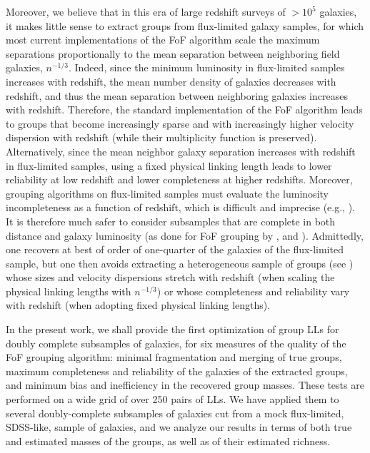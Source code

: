 Moreover, we believe that in this era of large  redshift surveys of $>10^5$
galaxies, it makes little sense to extract groups from flux-limited galaxy
samples, for which most current implementations of the FoF algorithm scale the
maximum separations proportionally to the mean  separation between neighboring
field galaxies, $n^{-1/3}$. Indeed, since the minimum luminosity in
flux-limited samples increases with redshift,  the mean number density of
galaxies decreases with redshift, and thus the mean separation between
neighboring galaxies increases with redshift. Therefore, the standard
implementation of the FoF algorithm leads to groups that become increasingly
sparse and with increasingly higher velocity dispersion with redshift (while
their multiplicity function is preserved). Alternatively, since the mean
neighbor galaxy separation increases with redshift in flux-limited samples,
using a fixed physical linking length leads to lower reliability at low
redshift and lower completeness at higher redshifts. Moreover, grouping
algorithms on flux-limited samples must evaluate the luminosity incompleteness
as a function of redshift, which is difficult and imprecise (e.g.,
\citealp{MDNC02,Yang+07}). It is therefore much safer to consider subsamples
that are complete in both distance and galaxy luminosity (as done for FoF
grouping by \citealp{Berlind+06}, \citealp{Tago+10} and \citealp{Tempel+14}).
Admittedly, one recovers at best of order of one-quarter of the galaxies of the
flux-limited sample, but one then avoids extracting a heterogeneous sample of
groups (see \citealp{Tempel+14}) whose sizes and velocity dispersions stretch
with redshift (when scaling the physical linking lengths with $n^{-1/3}$) or
whose completeness and reliability vary with redshift (when adopting fixed
physical linking lengths).

In the present work, we shall provide the first optimization of group LLs for
doubly complete subsamples of galaxies, for six measures of the quality of the
FoF grouping algorithm: minimal fragmentation and merging of true groups,
maximum completeness and reliability of the galaxies of the extracted groups,
and minimum bias and inefficiency in the recovered group masses. These tests
are performed on a wide grid of over 250 pairs of LLs. We have applied them to
several doubly-complete subsamples of galaxies cut from a mock flux-limited,
SDSS-like,  sample of galaxies, and we analyze our results in terms of both
true and estimated masses of the groups, as well as of their estimated
richness.

